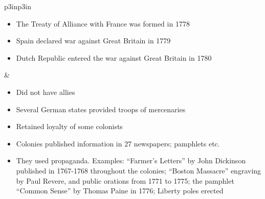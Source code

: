 
\begin{singlespace}
\footnotesize
  \tablelasttail{}
  \label{table:comparison}
\begin{mpxtabular}{p{3in}p{3in}}%
  \ML
  \begin{itemize}[nolistsep,leftmargin=*]
    \item The Treaty of Alliance with France was formed in 1778
    \item Spain declared war against Great Britain in 1779 
    \item Dutch Republic entered the war against Great Britain in 1780 \cite[85,89]{stewart_2005}
  \end{itemize}
  &
  \begin{itemize}[nolistsep,leftmargin=*]
      \item  Did not have allies
      \item  Several German states provided troops of
	mercenaries \cite[62]{stewart_2005}
      \item  Retained loyalty of some colonists
  \end{itemize}\ML
  \ML
	\begin{itemize}[nolistsep,leftmargin=*]
	    \item  Colonies published information in 27 newspapers; pamphlets
	      etc. \cite[49,199]{knollenberg_growth_2003}
	    \item  They used propaganda.  Examples: ``Farmer's Letters'' by John
	      Dickinson published in 1767-1768 throughout the colonies; “Boston
	      Massacre” engraving by Paul Revere, and public orations from 1771
	      to 1775; the pamphlet “Common Sense” by Thomas Paine in 1776;
	      Liberty poles
	      erected \cite[3,48-53,81,227]{knollenberg_growth_2003} \cite[101]{ladenburg_causes_1989}

\end{itemize}
\end{mpxtabular}
\end{singlespace}
